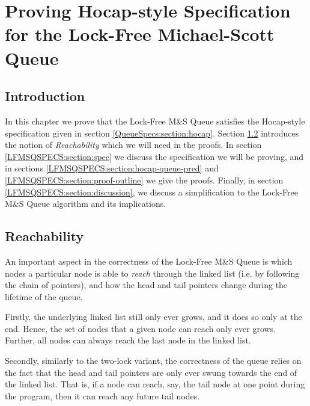 \documentclass[a4paper, 10pt]{report}
\theoremstyle{definition}
\newcommand{\msq}{M\&S Queue}
\newcommand{\lfmsq}{Lock-Free \msq{}}
\begin{document}

\chapter{Proving Hocap-style Specification for the Lock-Free Michael-Scott Queue}
\label{ch:LFMSQSPECS}

\section{Introduction}
\label{LFMSQSPECS:section:introduction}

In this chapter we prove that the \lfmsq{} satisfies the Hocap-style specification given in section \ref{QueueSpecs:section:hocap}. Section \ref{LFMSQSPECS:section:reachability} introduces the notion of \textit{Reachability} which we will need in the proofs. In section \ref{LFMSQSPECS:section:spec} we discuss the specification we will be proving, and in sections \ref{LFMSQSPECS:section:hocap-queue-pred} and \ref{LFMSQSPECS:section:proof-outline} we give the proofs. Finally, in section \ref{LFMSQSPECS:section:discussion}, we discuss a simplification to the \lfmsq{} algorithm and its implications.

\section{Reachability}
\label{LFMSQSPECS:section:reachability}

An important aspect in the correctness of the \lfmsq{} is which nodes a particular node is able to \textit{reach} through the linked list (i.e. by following the chain of pointers), and how the head and tail pointers change during the lifetime of the queue.

Firstly, the underlying linked list still only ever grows, and it does so only at the end. Hence, the set of nodes that a given node can reach only ever grows. Further, all nodes can always reach the last node in the linked list.

Secondly, similarly to the two-lock variant, the correctness of the queue relies on the fact that the head and tail pointers are only ever swung towards the end of the linked list. That is, if a node can reach, say, the tail node at one point during the program, then it can reach any future tail nodes.
\end{document}
